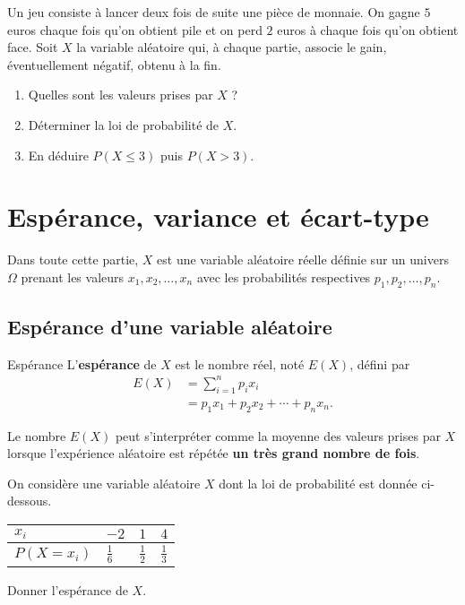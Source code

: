 \documentclass[11pt]{article}
\begin{document}
\begin{app}
  Un jeu consiste à lancer deux fois de suite une pièce de monnaie. On gagne $5$
  euros chaque fois qu'on obtient pile et on perd $2$ euros à chaque fois qu'on
  obtient face. Soit $X$ la variable aléatoire qui, à chaque partie, associe le
  gain, éventuellement négatif, obtenu à la fin.
  \begin{enumerate}
    \item Quelles sont les valeurs prises par $X$ ?
    \item Déterminer la loi de probabilité de $X$.
    \item En déduire $P\left( X\leq3 \right)$ puis $P\left( X>3 \right)$.
  \end{enumerate}
\end{app}

\section{Espérance, variance et écart-type}
Dans toute cette partie, $X$ est une variable aléatoire réelle définie sur un
univers $\Omega$ prenant les valeurs $x_1, x_2, \ldots, x_n$ avec les
probabilités respectives $p_1, p_2, \ldots, p_n$.

\subsection{Espérance d'une variable aléatoire}

\begin{defi}{Espérance}
  L'\textbf{espérance} de $X$ est le nombre réel, noté $E\left( X \right)$,
  défini par
  \begin{align*}
    E\left( X \right) &= \sum_{i=1}^n p_ix_i \\
    &= p_1x_1+p_2x_2+\cdots+p_nx_n.
  \end{align*}
\end{defi}

\begin{rmq}
  Le nombre $E\left( X \right)$ peut s'interpréter comme la moyenne des valeurs
  prises par $X$ lorsque l'expérience aléatoire est répétée \textbf{un très
  grand nombre de fois}.
\end{rmq}

\begin{app}
  On considère une variable aléatoire $X$ dont la loi de probabilité est donnée
  ci-dessous.
  \begin{center}
    \renewcommand{\arraystretch}{1.3}
    \begin{tabularx}{.7\textwidth}{|Y|Y|Y|Y|}
      \hline
      $x_i$ & $-2$ & $1$ & $4$ \\
      \hline
      $P\left( X = x_i \right)$ & $\frac{1}{6}$ & $\frac{1}{2}$ &
      $\frac{1}{3}$ \\
      \hline
    \end{tabularx}
  \end{center}
  Donner l'espérance de $X$.
\end{app}
\end{document}
